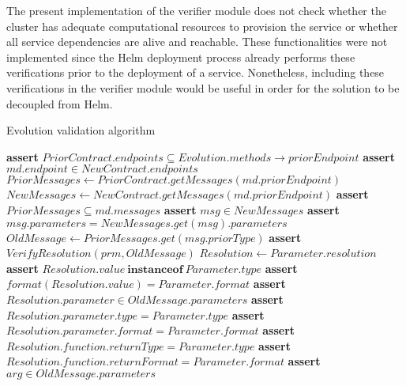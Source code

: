 The present implementation of the verifier module does not check whether the cluster has adequate computational resources to provision the service or whether all service dependencies are alive and reachable.
These functionalities were not implemented since the Helm deployment process already performs these verifications prior to the deployment of a service.
Nonetheless, including these verifications in the verifier module would be useful in order for the solution to be decoupled from Helm.

\begin{algorithm}
    \caption{Evolution validation algorithm}\label{alg:evoalg}
    \begin{algorithmic}[1]
            \State \textbf{assert} $PriorContract.endpoints \subseteq Evolution.methods\rightarrow priorEndpoint$
                \State \textbf{assert} $md.endpoint \in NewContract.endpoints$
                \State $PriorMessages \leftarrow PriorContract.getMessages(md.priorEndpoint)$
                \State $NewMessages \leftarrow NewContract.getMessages(md.priorEndpoint)$
                \State \textbf{assert} $PriorMessages \subseteq md.messages$
                    \State \textbf{assert} $msg \in NewMessages$
                    \State \textbf{assert} $msg.parameters = NewMessages.get(msg).parameters$
                        \State $OldMessage \leftarrow PriorMessages.get(msg.priorType)$
                        \State \textbf{assert} $VerifyResolution(prm, OldMessage)$
                    \EndFor
                \EndFor
            \EndFor
        \EndProcedure
        \Statex
            \State $Resolution \leftarrow Parameter.resolution$
                \State \textbf{assert} $Resolution.value\ \textbf{instanceof}\ Parameter.type$
                \State \textbf{assert} $format(Resolution.value) = Parameter.format$
                \State \textbf{assert} $Resolution.parameter \in OldMessage.parameters$
                \State \textbf{assert} $Resolution.parameter.type = Parameter.type$
                \State \textbf{assert} $Resolution.parameter.format = Parameter.format$
                \State \textbf{assert} $Resolution.function.returnType = Parameter.type$
                \State \textbf{assert} $Resolution.function.returnFormat = Parameter.format$
                    \State \textbf{assert} $arg \in OldMessage.parameters$
                \EndFor
            \EndIf
        \EndProcedure
    \end{algorithmic}
\end{algorithm}

